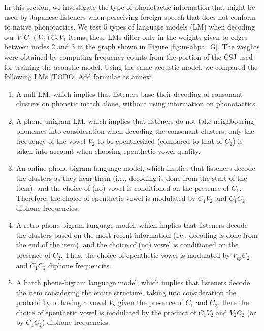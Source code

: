 {In this section, we investigate the type of phonotactic information that might be used by Japanese listeners when perceiving foreign speech that does not conform to native phonotactics. We test 5 types of language models (LM) when decoding our $V_{1}C_{1}(V_{2})C_{2}V_{1}$ items; these LMs differ only in the weights given to edges between nodes 2 and 3 in the graph shown in Figure \ref{fig:m-ahpa_G}. The weights were obtained by computing frequency counts from the portion of the CSJ used for training the acoustic model. Using the same acoustic model, we compared the following LMs {\color{red}[TODO] Add formulae as annex}: 

\begin{enumerate}
    \item A null LM, which implies that listeners base their decoding of consonant clusters on phonetic match alone, without using information on phonotactics.
    \item A phone-unigram LM, which implies that listeners do not take neighbouring phonemes into consideration when decoding the consonant clusters; only the frequency of the vowel $V_{2}$ to be epenthesized (compared to that of $C_{2}$) is taken into account when choosing epenthetic vowel quality.
    \item An online phone-bigram language model, which implies that listeners decode the clusters as they hear them (i.e., decoding is done from the start of the item), and the choice of (no) vowel is conditioned on the presence of $C_{1}$. Therefore, the choice of epenthetic vowel is modulated by $C_{1}V_{2}$ and $C_{1}C_{2}$ diphone frequencies. 
    \item A retro phone-bigram language model, which implies that listeners decode the clusters based on the most recent information (i.e., decoding is done from the end of the item), and the choice of (no) vowel is conditioned on the presence of $C_{2}$. Thus, the choice of epenthetic vowel is modulated by $V_{ep}C_{2}$ and $C_{1}C_{2}$ diphone frequencies.
    \item A batch phone-bigram language model, which implies that listeners decode the item considering the entire structure, taking into consideration the probability of having a vowel $V_{2}$ given the presence of $C_{1}$ and $C_{2}$. Here the choice of epenthetic vowel is modulated by the product of $C_{1}V_{2}$ and $V_{2}C_{2}$ (or by $C_{1}C_{2}$) diphone frequencies.  
\end{enumerate}
    
}
